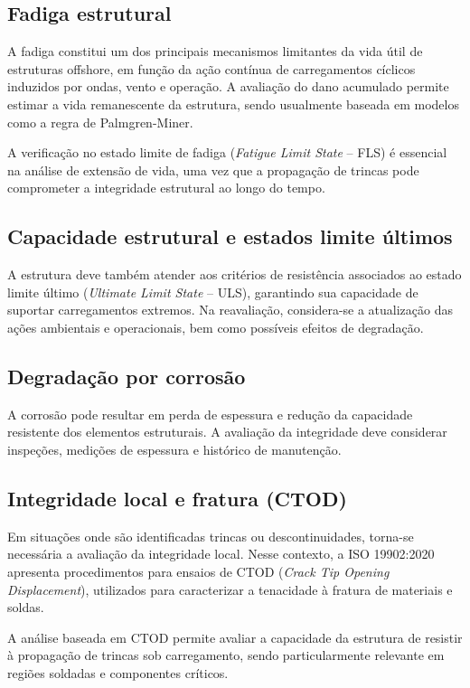 \documentclass[a4paper,12pt]{article}
\begin{document}
\subsection{Fadiga estrutural}

A fadiga constitui um dos principais mecanismos limitantes da vida útil de estruturas offshore, em função da ação contínua de carregamentos cíclicos induzidos por ondas, vento e operação. A avaliação do dano acumulado permite estimar a vida remanescente da estrutura, sendo usualmente baseada em modelos como a regra de Palmgren-Miner.

A verificação no estado limite de fadiga (\textit{Fatigue Limit State} -- FLS) é essencial na análise de extensão de vida, uma vez que a propagação de trincas pode comprometer a integridade estrutural ao longo do tempo.

\subsection{Capacidade estrutural e estados limite últimos}

A estrutura deve também atender aos critérios de resistência associados ao estado limite último (\textit{Ultimate Limit State} -- ULS), garantindo sua capacidade de suportar carregamentos extremos. Na reavaliação, considera-se a atualização das ações ambientais e operacionais, bem como possíveis efeitos de degradação.

\subsection{Degradação por corrosão}

A corrosão pode resultar em perda de espessura e redução da capacidade resistente dos elementos estruturais. A avaliação da integridade deve considerar inspeções, medições de espessura e histórico de manutenção.

\subsection{Integridade local e fratura (CTOD)}

Em situações onde são identificadas trincas ou descontinuidades, torna-se necessária a avaliação da integridade local. Nesse contexto, a ISO 19902:2020 apresenta procedimentos para ensaios de CTOD (\textit{Crack Tip Opening Displacement}), utilizados para caracterizar a tenacidade à fratura de materiais e soldas.

A análise baseada em CTOD permite avaliar a capacidade da estrutura de resistir à propagação de trincas sob carregamento, sendo particularmente relevante em regiões soldadas e componentes críticos.
\end{document}
